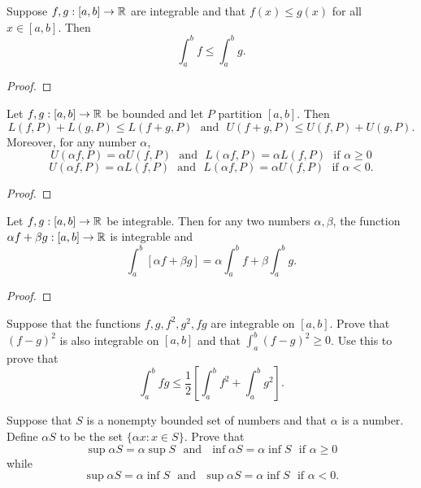 \documentclass[letterpaper, twoside, 12pt]{book}
\begin{document}
\begin{theorem}
  Suppose \(f,g:[a,b]\to\mathbb R\) are integrable and that \(f(x)\leq g(x)\)
  for all \(x\in[a,b]\). Then
  \[
    \int_a^b f \leq \int_a^b g
  .\]
\end{theorem}
\begin{proof}

\end{proof}


\begin{lemma}[6.14]
  Let \(f,g:[a,b]\to\mathbb R\) be bounded and let \(P\) partition \([a,b]\).
  Then
  \[
    L(f,P)+L(g,P)\leq L(f+g,P)
      \text{~~and~~}
    U(f+g,P)\leq U(f,P)+U(g,P)
  .\]
  Moreover, for any number \(\alpha\),
  \[
    U(\alpha f,P)=\alpha U(f,P)
      \text{~~and~~}
    L(\alpha f,P)=\alpha L(f,P)
      \text{~~if~}
    \alpha\geq 0
  \]
  \[
    U(\alpha f,P)=\alpha L(f,P)
      \text{~~and~~}
    L(\alpha f,P)=\alpha U(f,P)
      \text{~~if~}
    \alpha< 0
  .\]
\end{lemma}
\begin{proof}

\end{proof}


\begin{theorem}
  Let \(f,g:[a,b]\to\mathbb R\) be integrable. Then for any two numbers
  \(\alpha,\beta\), the function \(\alpha f+\beta g:[a,b]\to\mathbb R\) is
  integrable and
  \[
    \int_a^b[\alpha f+\beta g]=\alpha\int_a^b f + \beta\int_a^b g
  .\]
\end{theorem}
\begin{proof}

\end{proof}


\begin{exercise}[1]
  Suppose that the functions \(f,g,f^2,g^2,fg\) are integrable on \([a,b]\).
  Prove that \((f-g)^2\) is also integrable on \([a,b]\) and that
  \(\int_a^b(f-g)^2\geq0\). Use this to prove that
  \[
    \int_a^b fg
      \leq
    \frac{1}{2}\left[
      \int_a^b f^2 + \int_a^b g^2
    \right]
  .\]
\end{exercise}
\begin{solution}

\end{solution}

\begin{exercise}[4]
  Suppose that \(S\) is a nonempty bounded set of numbers and that \(\alpha\)
  is a number. Define \(\alpha S\) to be the set \(\{\alpha x:x\in S\}\).
  Prove that
  \[
    \sup\alpha S=\alpha\sup S
      \text{~~and~~}
    \inf\alpha S=\alpha\inf S
      \text{~~if~}
    \alpha\geq 0
  \]
  while
  \[
    \sup\alpha S=\alpha\inf S
      \text{~~and~~}
    \sup\alpha S=\alpha\inf S
      \text{~~if~}
    \alpha< 0
  .\]
\end{exercise}
\begin{solution}

\end{solution}
\end{document}
